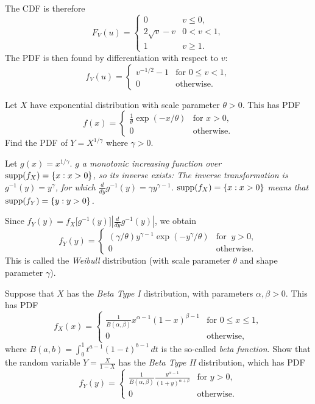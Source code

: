 \begin{exercise}
\begin{questions}
\begin{answer}
The CDF is therefore
\[
F_V(u) = \left\{\begin{array}{ll}
	0  				& v \leq 0, \\
	2\sqrt{v}-v  	& 0 < v < 1, \\
	1				& v \geq 1.
\end{array}\right.
\]
The PDF is then found by differentiation with respect to $v$:
\[
f_V(u) = \left\{\begin{array}{ll}
	v^{-1/2} - 1  	& \text{for } 0 \leq v < 1, \\
	0				& \text{otherwise.}
\end{array}\right.	
\]
\end{answer}

\question
Let $X$ have exponential distribution with scale parameter $\theta>0$. This has PDF
\[
f(x) = \left\{\begin{array}{ll}
	\frac{1}{\theta}\exp(-x/\theta) 	& \text{for } x > 0,  \\
	0								& \text{otherwise.}
\end{array}\right.
\]
Find the PDF of $Y = X^{1/\gamma}$ where $\gamma > 0$. 


\begin{answer}
Let $g(x) = x^{1/\gamma}$. 
\bit
\it $g$ a monotonic increasing function over $\text{supp}(f_X)=\{x:x>0\}$, so its inverse exists:
\it The inverse transformation is $g^{-1}(y) = y^{\gamma}$, for which $\displaystyle\frac{d}{dy}g^{-1}(y) = \gamma y^{\gamma-1}$.
\it $\text{supp}(f_X)=\{x:x>0\}$ means that $\text{supp}(f_Y)=\{y:y>0\}$.
\eit

Since $f_Y(y) = f_X\big[g^{-1}(y)\big]\left|\displaystyle\frac{d}{dy}g^{-1}(y)\right|$, we obtain
\[
f_Y(y) = \left\{\begin{array}{ll}
	(\gamma/\theta)y^{\gamma-1}\exp(-y^{\gamma }/\theta) & \text{for }\ y>0, \\
	0		& \text{otherwise.}
\end{array}\right.	
\]
This is called the \emph{Weibull} distribution (with scale parameter $\theta$ and shape parameter $\gamma$).
\end{answer}

\question
Suppose that $X$ has the \emph{Beta Type I} distribution, with parameters $\alpha,\beta>0$. This has PDF
\[
f_X(x) = \left\{\begin{array}{ll}
	\displaystyle\frac{1}{B(\alpha,\beta)} x^{\alpha-1}(1-x)^{\beta-1}	& \text{for } 0\leq x\leq 1,  \\
	0													& \text{otherwise,}
\end{array}\right.
\]
where $\displaystyle B(a,b) = \int_0^1 t^{a-1}(1-t)^{b-1}\,dt$ is the so-called \emph{beta function}.
%
Show that the random variable $\displaystyle Y=\frac{X}{1-X}$ has the \emph{Beta Type II} distribution, which has PDF
\[
f_Y(y) = \left\{\begin{array}{ll}
	\displaystyle\frac{1}{B(\alpha,\beta)}\frac{y^{\alpha-1}}{(1+y)^{\alpha+\beta}}	& \text{for } y>0, \\
	0 & \text{otherwise.}
\end{array}\right.	
\]


\end{questions}
\end{exercise}

